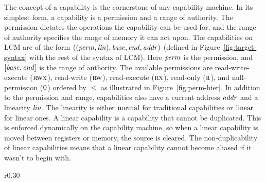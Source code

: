 \documentclass[acmsmall,screen]{acmart}\settopmatter{}
\newcommand{\trgcm}{\textsc{LCM}}
\begin{document}
The concept of a capability is the cornerstone of any capability machine.
In its simplest form, a capability is a permission and a range of authority.
The permission dictates the operations the capability can be used for, and the range of authority specifies the range of memory it can act upon.
The capabilities on \trgcm{} are of the form $((\mathit{perm},\mathit{lin}),\mathit{base},\mathit{end},\mathit{addr})$ (defined in Figure~\ref{fig:target-syntax} with the rest of the syntax of \trgcm{}). Here $\mathit{perm}$ is the permission, and $[\mathit{base},\mathit{end}]$ is the range of authority.
The available permissions are read-write-execute ($\textsc{rwx}$), read-write ($\textsc{rw}$), read-execute ($\textsc{rx}$), read-only ($\textsc{r}$), and null-permission ($\textsc{0}$) ordered by $\le$ as illustrated in Figure~\ref{fig:perm-hier}.
In addition to the permission and range, capabilities also have a current address $\mathit{addr}$ and a linearity $\mathit{lin}$.
The linearity is either $\mathrm{normal}$ for traditional capabilities or $\mathrm{linear}$ for linear ones.
A linear capability is a capability that cannot be duplicated.
This is enforced dynamically on the capability machine, so when a linear capability is moved between registers or memory, the source is cleared.
The non-duplicability of linear capabilities means that a linear capability cannot become aliased if it wasn't to begin with.

\begin{wrapfigure}{r}{0.30\linewidth}
  \centering

  \caption{Permission hierarchy}
  \label{fig:perm-hier}
\end{wrapfigure}%
%
\end{document}
